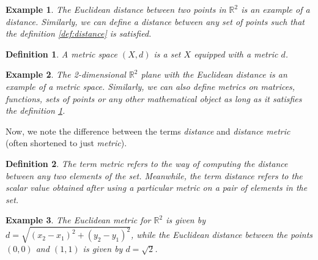 \documentclass[conference]{IEEEtran}
\newtheorem{defn}{Definition}[section]
\newtheorem{exmp}{Example}[section]
\begin{document}
\begin{exmp}
The Euclidean distance between two points in $\mathbb{R}^2$ is an example of a distance. Similarly, we can define a distance between any set of points such that the definition \ref{def:distance} is satisfied.
\end{exmp}

\begin{defn} \label{def:metric_space}
A metric space $(X,d)$ is a set $X$ equipped with a metric $d$.
\end{defn}

\begin{exmp}
The 2-dimensional $\mathbb{R}^2$ plane with the Euclidean distance is an example of a metric space.  Similarly, we can also define metrics on matrices, functions, sets of points or any other mathematical object as long as it satisfies the definition \ref{def:metric_space}.
\end{exmp}

Now, we note the difference between the terms \emph{distance} and \emph{distance metric} (often shortened to just \emph{metric}).
\begin{defn}
The term \emph{metric} refers to the way of computing the distance between any two elements of the set. Meanwhile, the term \emph{distance} refers to the scalar value obtained after using a particular metric on a pair of elements in the set.
\end{defn}

\begin{exmp}
The Euclidean metric for $\mathbb{R}^2$ is given by $ d = \sqrt{(x_2 - x_1)^2 + (y_2 - y_1)^2} $, while the Euclidean distance between the points $(0,0)$ and $(1,1)$ is given by $ d = \sqrt{2} $.
\end{exmp}
\end{document}
